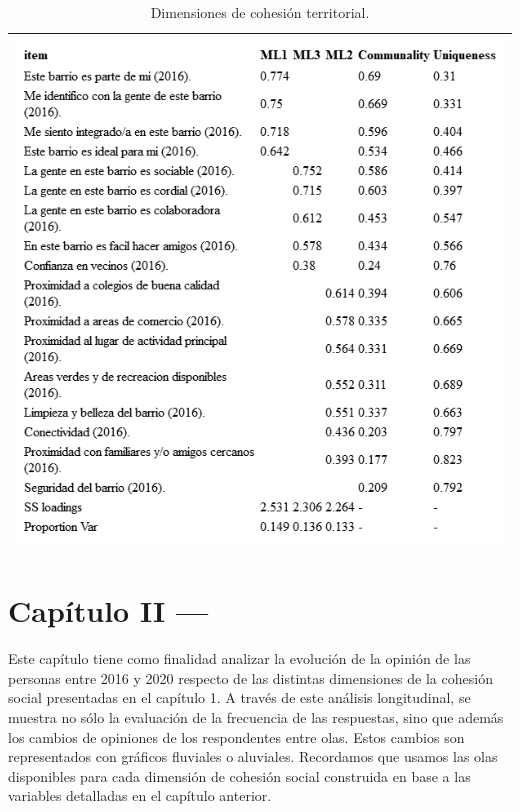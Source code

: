 \documentclass[
  12pt,
]{book}
\begin{document}
\begin{longtable}[]{@{}l@{}}
\caption{\label{tab:cohesion-territorial-fa}Dimensiones de cohesión territorial.}\tabularnewline
\toprule
\endhead
\includegraphics[width=8.33333in,height=\textheight]{output/tables/cohesion_territorial_fa.png} \\
\bottomrule
\end{longtable}

\hypertarget{capuxedtulo-ii}{%
\chapter{Capítulo II ---}\label{capuxedtulo-ii}}

Este capítulo tiene como finalidad analizar la evolución de la opinión de las personas entre 2016 y 2020 respecto de las distintas dimensiones de la cohesión social presentadas en el capítulo 1. A través de este análisis longitudinal, se muestra no sólo la evaluación de la frecuencia de las respuestas, sino que además los cambios de opiniones de los respondentes entre olas. Estos cambios son representados con gráficos fluviales o aluviales. Recordamos que usamos las olas disponibles para cada dimensión de cohesión social construida en base a las variables detalladas en el capítulo anterior.
\end{document}
